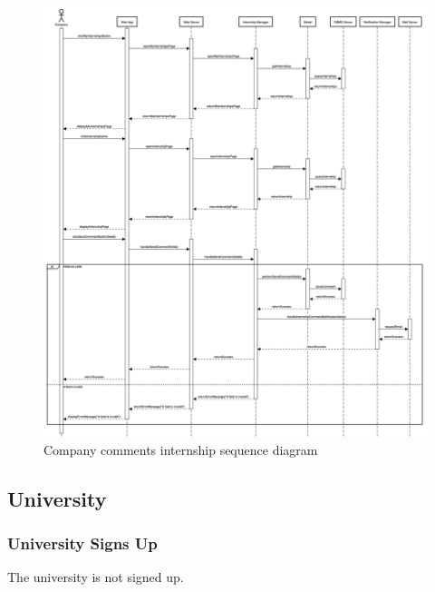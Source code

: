 \begin{figure}[h!] 
    \centering
    \includegraphics[width=16cm]{images/sequence-diagrams/company-comments-internship.png}
    \caption{Company comments internship sequence diagram}
\end{figure}

\newpage
\subsection{University}
\subsubsection{University Signs Up}
The university is not signed up.

